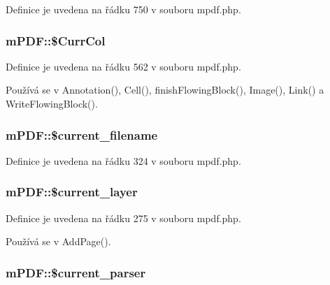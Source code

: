 Definice je uvedena na řádku 750 v souboru mpdf.\-php.

\hypertarget{classm_p_d_f_a22d6f27f999c4d59c763ba55a6218c2e}{
\subsubsection[{\$\-Curr\-Col}]{\setlength{\rightskip}{0pt plus 5cm}m\-P\-D\-F\-::\$\-Curr\-Col}}\label{classm_p_d_f_a22d6f27f999c4d59c763ba55a6218c2e}


Definice je uvedena na řádku 562 v souboru mpdf.\-php.



Používá se v Annotation(), Cell(), finish\-Flowing\-Block(), Image(), Link() a Write\-Flowing\-Block().

\hypertarget{classm_p_d_f_a12df0eaef682a8b25c120daedb22680d}{
\subsubsection[{\$current\-\_\-filename}]{\setlength{\rightskip}{0pt plus 5cm}m\-P\-D\-F\-::\$current\-\_\-filename}}\label{classm_p_d_f_a12df0eaef682a8b25c120daedb22680d}


Definice je uvedena na řádku 324 v souboru mpdf.\-php.

\hypertarget{classm_p_d_f_a9ab63038434f4edc1e18ddef8c3a235c}{
\subsubsection[{\$current\-\_\-layer}]{\setlength{\rightskip}{0pt plus 5cm}m\-P\-D\-F\-::\$current\-\_\-layer}}\label{classm_p_d_f_a9ab63038434f4edc1e18ddef8c3a235c}


Definice je uvedena na řádku 275 v souboru mpdf.\-php.



Používá se v Add\-Page().

\hypertarget{classm_p_d_f_a61b62e74151443b1071feab3fe4b7579}{
\subsubsection[{\$current\-\_\-parser}]{\setlength{\rightskip}{0pt plus 5cm}m\-P\-D\-F\-::\$current\-\_\-parser}}\label{classm_p_d_f_a61b62e74151443b1071feab3fe4b7579}


